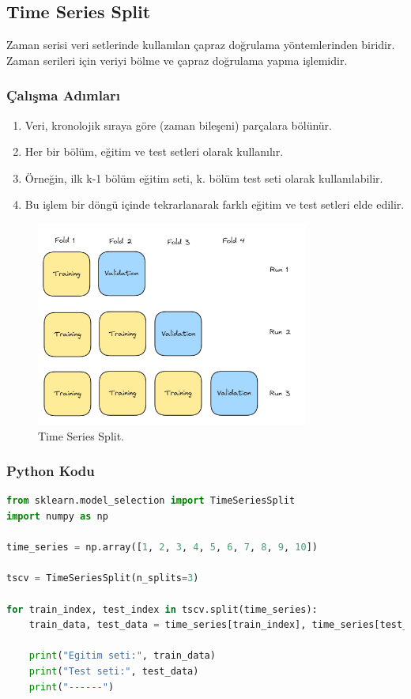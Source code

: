 \newpage

\subsection{Time Series Split}
Zaman serisi veri setlerinde kullanılan çapraz doğrulama yöntemlerinden biridir. Zaman serileri için veriyi bölme ve çapraz doğrulama yapma işlemidir.

\subsubsection{Çalışma Adımları}
\begin{enumerate}
    \item Veri, kronolojik sıraya göre (zaman bileşeni) parçalara bölünür.
    \item Her bir bölüm, eğitim ve test setleri olarak kullanılır.
    \item Örneğin, ilk k-1 bölüm eğitim seti, k. bölüm test seti olarak kullanılabilir.
    \item Bu işlem bir döngü içinde tekrarlanarak farklı eğitim ve test setleri elde edilir.
\end{enumerate}

\begin{figure}[h]
    \centering
    \includegraphics[width=0.8\textwidth]{images/time_series_split_structure.png}
    \caption{Time Series Split.}
    \label{fig:enter-label}
\end{figure}

\subsubsection{Python Kodu}

\begin{lstlisting}[language=Python, caption=Scikit-learn'de Time Series Split örneği.]
from sklearn.model_selection import TimeSeriesSplit
import numpy as np

time_series = np.array([1, 2, 3, 4, 5, 6, 7, 8, 9, 10])

tscv = TimeSeriesSplit(n_splits=3)

for train_index, test_index in tscv.split(time_series):
    train_data, test_data = time_series[train_index], time_series[test_index]
    
    print("Egitim seti:", train_data)
    print("Test seti:", test_data)
    print("------")
\end{lstlisting}

\newpage